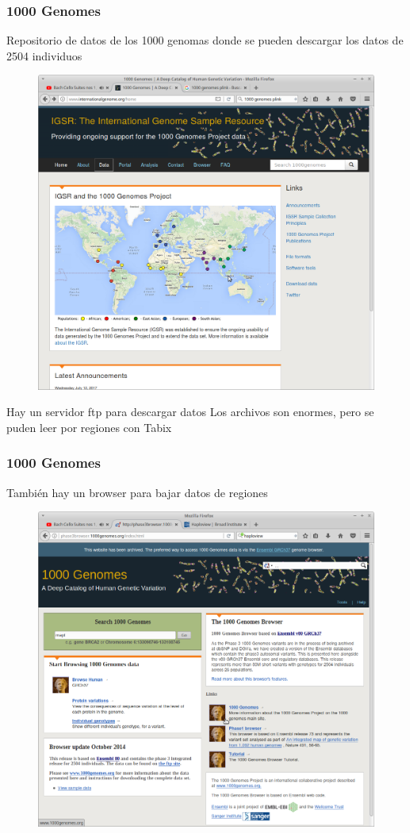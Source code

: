 \documentclass{beamer}\usepackage[]{graphicx}\usepackage[]{color}
\begin{document}
\begin{frame}[fragile]
\frametitle{1000 Genomes}
Repositorio de datos de los 1000 genomas donde se pueden descargar los datos de 2504 individuos

\begin{figure}[htbp]
\begin{center}
\includegraphics[width=.6\linewidth]{home1k.png}
\end{center}
\end{figure}
Hay un servidor ftp para descargar datos 
Los archivos son enormes, pero se puden leer por regiones con Tabix
\end{frame}



\begin{frame}[fragile]
\frametitle{1000 Genomes}
Tambi\'en hay un browser para bajar datos de regiones \begin{figure}[htbp]
\begin{center}
\includegraphics[width=.7\linewidth]{mapt.png}
\end{center}
\end{figure}

\end{frame}
\end{document}
